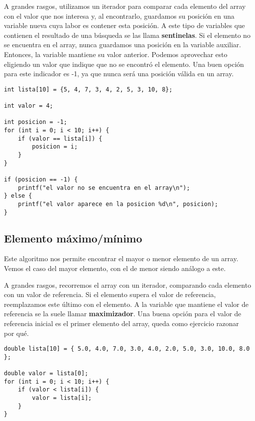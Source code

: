 \documentclass[10pt]{article}
\begin{document}
\bigskip

A grandes rasgos, utilizamos un iterador para comparar cada elemento del array con el valor que nos interesa y, al encontrarlo, guardamos su posición en una variable nueva cuya labor es contener esta posición. A este tipo de variables que contienen el resultado de una búsqueda se las llama \textbf{sentinelas}. Si el elemento no se encuentra en el array, nunca guardamos una posición en la variable auxiliar. Entonces, la variable mantiene su valor anterior. Podemos aprovechar esto eligiendo un valor que indique que no se encontró el elemento. Una buen opción para este indicador es -1, ya que nunca será una posición válida en un array.

\begin{lstlisting}
int lista[10] = {5, 4, 7, 3, 4, 2, 5, 3, 10, 8};

int valor = 4;

int posicion = -1;
for (int i = 0; i < 10; i++) {
	if (valor == lista[i]) {
		posicion = i;
	}
}

if (posicion == -1) {
	printf("el valor no se encuentra en el array\n");
} else {
	printf("el valor aparece en la posicion %d\n", posicion);
}
\end{lstlisting}

\subsection{Elemento máximo/mínimo}

Este algoritmo nos permite encontrar el mayor o menor elemento de un array. Vemos el caso del mayor elemento, con el de menor siendo análogo a este.

\bigskip

A grandes rasgos, recorremos el array con un iterador, comparando cada elemento con un valor de referencia. Si el elemento supera el valor de referencia, reemplazamos este último con el elemento. A la variable que mantiene el valor de referencia se la suele llamar \textbf{maximizador}. Una buena opción para el valor de referencia inicial es el primer elemento del array, queda como ejercicio razonar por qué.

\begin{lstlisting}
double lista[10] = { 5.0, 4.0, 7.0, 3.0, 4.0, 2.0, 5.0, 3.0, 10.0, 8.0 };

double valor = lista[0];
for (int i = 0; i < 10; i++) {
	if (valor < lista[i]) {
		valor = lista[i];
	}
}
\end{lstlisting}
\end{document}
